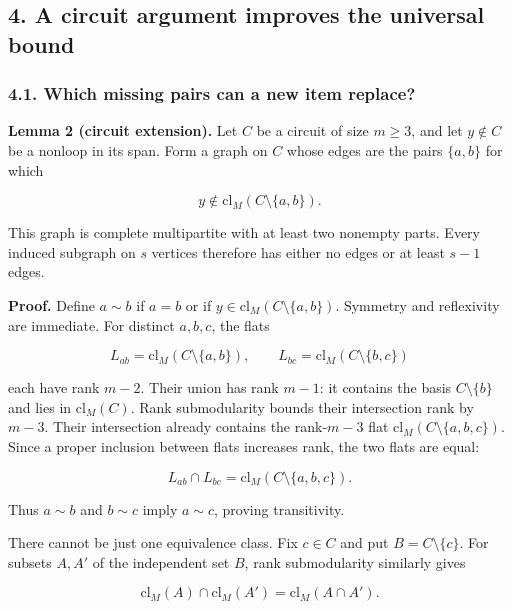 \hypertarget{af-0a3ce40617-a-circuit-argument-improves-the-universal-bound}{%
\subsection{4. A circuit argument improves the universal bound}\label{af-0a3ce40617-a-circuit-argument-improves-the-universal-bound}}

\hypertarget{af-0a3ce40617-which-missing-pairs-can-a-new-item-replace}{%
\subsubsection{4.1. Which missing pairs can a new item replace?}\label{af-0a3ce40617-which-missing-pairs-can-a-new-item-replace}}

\textbf{Lemma 2 (circuit extension).} Let \(C\) be a circuit of size \(m\ge3\), and let \(y\notin C\) be a nonloop in its span. Form a graph on \(C\) whose edges are the pairs \(\{a,b\}\) for which

\[
y\notin\mathrm{cl}_M(C\setminus\{a,b\}).
\]

This graph is complete multipartite with at least two nonempty parts. Every induced subgraph on \(s\) vertices therefore has either no edges or at least \(s-1\) edges.

\textbf{Proof.} Define \(a\sim b\) if \(a=b\) or if \(y\in\mathrm{cl}_M(C\setminus\{a,b\})\). Symmetry and reflexivity are immediate. For distinct \(a,b,c\), the flats

\[
L_{ab}=\mathrm{cl}_M(C\setminus\{a,b\}),
\qquad
L_{bc}=\mathrm{cl}_M(C\setminus\{b,c\})
\]

each have rank \(m-2\). Their union has rank \(m-1\): it contains the basis \(C\setminus\{b\}\) and lies in \(\mathrm{cl}_M(C)\). Rank submodularity bounds their intersection rank by \(m-3\). Their intersection already contains the rank-\(m-3\) flat \(\mathrm{cl}_M(C\setminus\{a,b,c\})\). Since a proper inclusion between flats increases rank, the two flats are equal:

\[
L_{ab}\cap L_{bc}
=\mathrm{cl}_M(C\setminus\{a,b,c\}).
\]

Thus \(a\sim b\) and \(b\sim c\) imply \(a\sim c\), proving transitivity.

There cannot be just one equivalence class. Fix \(c\in C\) and put \(B=C\setminus\{c\}\). For subsets \(A,A'\) of the independent set \(B\), rank submodularity similarly gives

\[
\mathrm{cl}_M(A)\cap\mathrm{cl}_M(A')
=\mathrm{cl}_M(A\cap A').
\]

